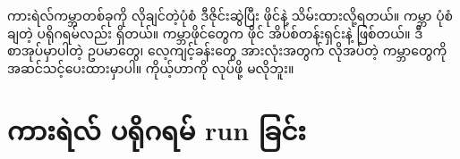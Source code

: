 ကားရဲလ်ကမ္ဘာတစ်ခုကို လိုချင်တဲ့ပုံစံ ဒီဇိုင်းဆွဲပြီး ဖိုင်နဲ့ သိမ်းထားလို့ရတယ်။ ကမ္ဘာ ပုံစံချတဲ့ ပရိုဂရမ်လည်း ရှိတယ်။ ကမ္ဘာဖိုင်တွေက  ဖိုင် အိပ်စ်တန်းရှင်းနဲ့ ဖြစ်တယ်။ ဒီစာအုပ်မှာပါတဲ့ ဥပမာတွေ၊ လေ့ကျင့်ခန်းတွေ အားလုံးအတွက် လိုအပ်တဲ့ ကမ္ဘာတွေကို အဆင်သင့်ပေးထားမှာပါ။ ကိုယ့်ဟာကို လုပ်ဖို့ မလိုဘူး။

\section{ကားရဲလ် ပရိုဂရမ် run ခြင်း}




%

%
%
%
%
%
